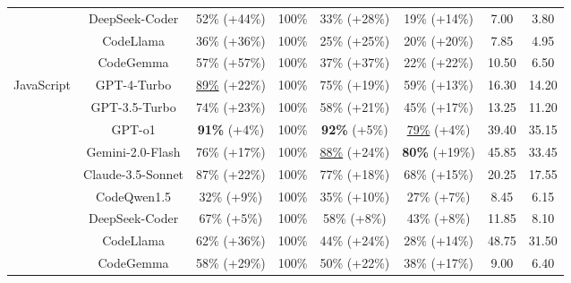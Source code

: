 \begin{table}[t]
{\begin{tabular}{cccccccc}
 & DeepSeek-Coder & 52\% (+44\%) & 100\%  & 33\% (+28\%) & 19\% (+14\%) & 7.00 & 3.80 \\
 & CodeLlama & 36\% (+36\%) & 100\%  & 25\% (+25\%) & 20\% (+20\%) & 7.85 & 4.95 \\
 & CodeGemma & 57\% (+57\%) & 100\%  & 37\% (+37\%) & 22\% (+22\%) & 10.50 & 6.50 \\
\hline
\multirow{9}{*}{JavaScript} & GPT-4-Turbo & \underline{89\%} (+22\%) & 100\%  & 75\% (+19\%) & 59\% (+13\%) & 16.30 & 14.20 \\
 & GPT-3.5-Turbo & 74\% (+23\%) & 100\%  & 58\% (+21\%) & 45\% (+17\%) & 13.25 & 11.20 \\
 & GPT-o1 & \textbf{91\%} (+4\%) & 100\% & \textbf{92\%} (+5\%) & \underline{79\%} (+4\%) & 39.40 & 35.15\\
 & Gemini-2.0-Flash & 76\% (+17\%) & 100\% & \underline{88\%} (+24\%) & \textbf{80\%} (+19\%) & 45.85 & 33.45 \\
 & Claude-3.5-Sonnet & 87\% (+22\%) & 100\% & 77\% (+18\%) & 68\% (+15\%) & 20.25 & 17.55 \\
 & CodeQwen1.5 & 32\% (+9\%) & 100\%  & 35\% (+10\%) & 27\% (+7\%) & 8.45 & 6.15 \\
 & DeepSeek-Coder & 67\% (+5\%) & 100\% & 58\% (+8\%) & 43\% (+8\%) & 11.85 & 8.10 \\
 & CodeLlama & 62\% (+36\%) & 100\%  & 44\% (+24\%) & 28\% (+14\%) & 48.75 & 31.50 \\
 & CodeGemma & 58\% (+29\%) & 100\%  & 50\% (+22\%) & 38\% (+17\%) & 9.00 & 6.40 \\
\hline
\end{tabular}
}
\label{tab: manual_results_improvements}
\vspace{-10pt}
\end{table}
